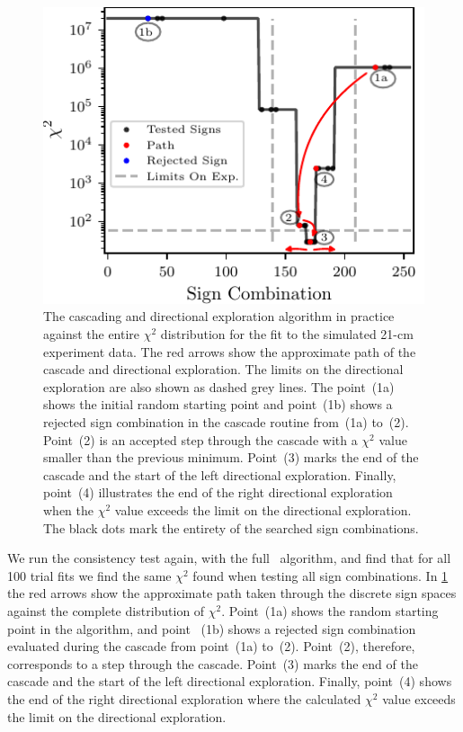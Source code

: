 \begin{figure}
    \centering
    \includegraphics{maxsmooth/figs/Figure4.pdf}
    \caption{The cascading and directional exploration algorithm in practice against the entire $\chi^2$ distribution for the fit to the simulated 21-cm experiment data. The red arrows show the approximate path of the cascade and directional exploration. The limits on the directional exploration are also shown as dashed grey lines. The point~(1a) shows the initial random starting point and point~(1b) shows a rejected sign combination in the cascade routine from~(1a) to~(2). Point~(2) is an accepted step through the cascade with a $\chi^2$ value smaller than the previous minimum. Point~(3) marks the end of the cascade and the start of the left directional exploration. Finally, point~(4) illustrates the end of the right directional exploration when the $\chi^2$ value exceeds the limit on the directional exploration. The black dots mark the entirety of the searched sign combinations.}
    \label{fig:Run_snapshots}
\end{figure}

We run the consistency test again, with the full \maxsmooth~algorithm, and find that for all 100 trial fits we find the same $\chi^2$ found when testing all sign combinations. In \cref{fig:Run_snapshots} the red arrows show the approximate path taken through the discrete sign spaces against the complete distribution of $\chi^2$. Point~(1a) shows the random starting point in the algorithm, and point ~(1b) shows a rejected sign combination evaluated during the cascade from point~(1a) to~(2). Point~(2), therefore, corresponds to a step through the cascade. Point~(3) marks the end of the cascade and the start of the left directional exploration. Finally, point~(4) shows the end of the right directional exploration where the calculated $\chi^2$ value exceeds the limit on the directional exploration.

